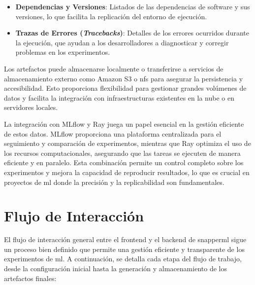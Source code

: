\begin{itemize}
\begin{itemize}
              \item \textbf{Dependencias y Versiones}: Listados de las dependencias de software y sus versiones, lo que facilita la replicación del entorno de ejecución.
              \item \textbf{Trazas de Errores (\textit{Tracebacks})}: Detalles de los errores ocurridos durante la ejecución, que ayudan a los desarrolladores a diagnosticar y corregir problemas en los experimentos.
          \end{itemize}
          Los \gls{artefactos} puede almacenarse localmente o transferirse a servicios de almacenamiento externo como Amazon S3 o \acrfull{nfs} para asegurar la persistencia y accesibilidad. Esto proporciona flexibilidad para gestionar grandes volúmenes de datos y facilita la integración con infraestructuras existentes en la nube o en servidores locales.
\end{itemize}
La integración con MLflow y Ray juega un papel esencial en la gestión eficiente de estos datos. MLflow proporciona una plataforma centralizada para el seguimiento y comparación de experimentos, mientras que Ray optimiza el uso de los recursos computacionales, asegurando que las tareas se ejecuten de manera eficiente y en paralelo. Esta combinación permite un control completo sobre los experimentos y mejora la capacidad de reproducir resultados, lo que es crucial en proyectos de \acrshort{ml} donde la precisión y la replicabilidad son fundamentales.

\section{Flujo de Interacción}

El flujo de interacción general entre el \gls{frontend} y el \gls{backend} de \Gls{snapperml} sigue un proceso bien definido que permite una gestión eficiente y transparente de los experimentos de \acrlong{ml}. A continuación, se detalla cada etapa del flujo de trabajo, desde la configuración inicial hasta la generación y almacenamiento de los \gls{artefactos} finales:

